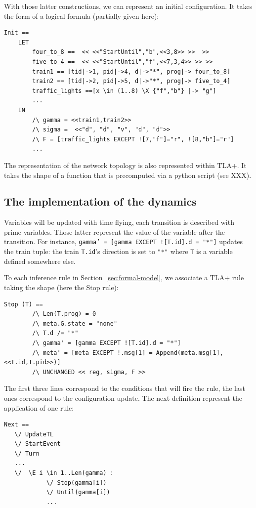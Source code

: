 \documentclass[runningheads]{llncs}
\begin{document}
With those latter constructions, we can represent an initial configuration. It takes the form of a logical formula (partially given here):
\begin{verbatim}
Init == 
    LET 
        four_to_8 ==  << <<"StartUntil","b",<<3,8>> >>  >>
        five_to_4 ==  << <<"StartUntil","f",<<7,3,4>> >> >>
        train1 == [tid|->1, pid|->4, d|->"*", prog|-> four_to_8]
        train2 == [tid|->2, pid|->5, d|->"*", prog|-> five_to_4]
        traffic_lights ==[x \in (1..8) \X {"f","b"} |-> "g"]
        ...
    IN
        /\ gamma = <<train1,train2>>
        /\ sigma =  <<"d", "d", "v", "d", "d">> 
        /\ F = [traffic_lights EXCEPT ![7,"f"]="r", ![8,"b"]="r"]
        ...
\end{verbatim}

The representation of the network topology is also represented within TLA+. It takes the shape of a function that is precomputed via a python script (see XXX). 

\subsection{The implementation of the dynamics}

Variables will be updated with time flying, each transition is described with prime variables. Those latter represent the value of the variable after the transition. For instance, \texttt{gamma' = [gamma EXCEPT ![T.id].d = "*"]} updates the train tuple: the train \texttt{T.id}'s direction is set to \texttt{"*"} where  \texttt{T} is a variable  defined somewhere else. 

To each inference rule in Section~\ref{sec:formal-model}, we associate a TLA+ rule taking the shape (here the Stop rule): 
\begin{verbatim}
Stop (T) ==
        /\ Len(T.prog) = 0
        /\ meta.G.state = "none"
        /\ T.d /= "*"
        /\ gamma' = [gamma EXCEPT ![T.id].d = "*"]
        /\ meta' = [meta EXCEPT !.msg[1] = Append(meta.msg[1],<<T.id,T.pid>>)]
        /\ UNCHANGED << reg, sigma, F >>
 \end{verbatim}
The first three lines correspond to the conditions that will fire the rule, the last ones correspond to the configuration update. The next definition represent the application of one rule:
\begin{verbatim}
Next == 
   \/ UpdateTL
   \/ StartEvent
   \/ Turn
   ...
   \/  \E i \in 1..Len(gamma) :
            \/ Stop(gamma[i])
            \/ Until(gamma[i])
            ...
\end{verbatim}       
        
\end{document}

